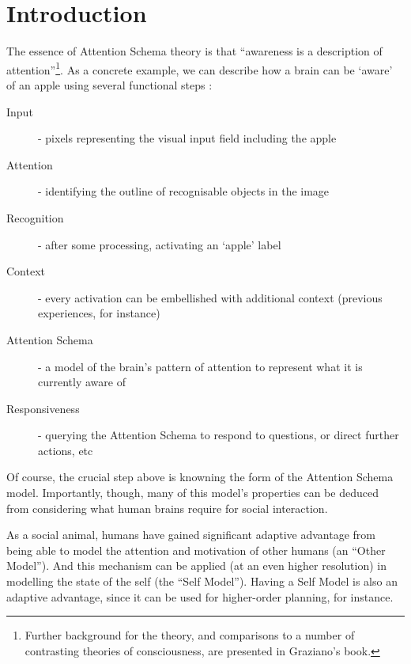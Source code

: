 \documentclass[citeauthoryear]{llncs}
\begin{document}
\section{Introduction}

The essence of Attention Schema theory is that ``awareness is a description of 
attention''\footnote{Further background for the theory, 
and comparisons to a number of contrasting theories of consciousness,
are presented in Graziano's \cite{graziano2013consciousness} book.}.
As a concrete example, we can describe how a brain can be `aware' of an apple
using several functional steps :

\begin{description}
\item[Input] - pixels representing the visual input field including the apple
\item[Attention] - identifying the outline of recognisable objects in the image 
\item[Recognition] - after some processing, activating an `apple' label
\item[Context] - every activation can be embellished with additional context (previous experiences, for instance)
\item[Attention Schema] - a model of the brain's pattern of attention to represent what it is currently aware of
\item[Responsiveness] - querying the Attention Schema to respond to questions, or direct further actions, etc
\end{description}

Of course, the crucial step above is knowning the form of the Attention Schema model.  
Importantly, though, many of this model's properties can be deduced from considering 
what human brains require for social interaction.

As a social animal, humans have gained significant adaptive advantage from 
being able to model the attention and motivation of other humans (an ``Other Model'').  
%
And this mechanism can be applied (at an even higher resolution) in 
modelling the state of the self (the ``Self Model'').  
Having a Self Model is also an adaptive advantage, since it can be used for 
higher-order planning, for instance. 
%



\end{document}

